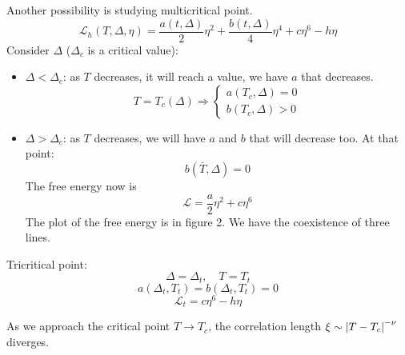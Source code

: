 \documentclass[../main/main.tex]{subfiles}
\begin{document}
Another possibility is studying multicritical point.
\begin{equation}
  \mathcal{L}_h (T, \Delta, \eta ) = \frac{a (t,\Delta )}{2} \eta ^2 + \frac{b(t,\Delta )}{4} \eta ^4 + c \eta ^6 - h \eta
\end{equation}
Consider \( \Delta  \) (\( \Delta _c \) is a critical value):
\begin{itemize}
\item \( \Delta < \Delta _c \): as \( T \) decreases, it will reach a value, we have \( a \) that decreases.
\begin{equation}
  T = T_c (\Delta ) \Rightarrow \begin{cases}
    a (T_c,\Delta ) = 0 \\
    b (T_c,\Delta ) > 0
\end{cases}
\end{equation}
\item \( \Delta > \Delta _c \): as \( T \) decreases, we will have \( a \) and \( b \) that will decrease too. At that point:
\begin{equation}
b (\bar{T},\Delta  ) = 0
\end{equation}
The free energy now is
\begin{equation}
  \mathcal{L} = \frac{a}{2} \eta ^2 + c \eta ^6
\end{equation}
The plot of the free energy is in figure 2. We have the coexistence of three lines.
\end{itemize}
Tricritical point:
\begin{equation}
  \Delta = \Delta _t, \quad T=T_t
\end{equation}
\begin{equation}
  a (\Delta _t, T_t) = b (\Delta _t, T_t) = 0
\end{equation}
\begin{equation}
  \mathcal{L}_t = c \eta ^6 - h \eta
\end{equation}


As we approach the critical point \( T \rightarrow T_c \), the correlation length
\( \xi \sim \abs{T-T_c}^{-\nu }  \) diverges.
\end{document}
